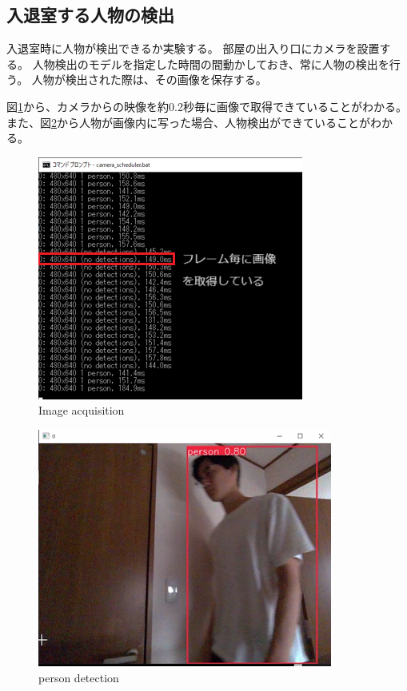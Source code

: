 \documentclass[10pt]{jarticle}
\begin{document}
    \subsection{入退室する人物の検出}
    \label{experiment1}

入退室時に人物が検出できるか実験する。
部屋の出入り口にカメラを設置する。
人物検出のモデルを指定した時間の間動かしておき、常に人物の検出を行う。
人物が検出された際は、その画像を保存する。

図\ref{Image acquisition}から、カメラからの映像を約0.2秒毎に画像で取得できていることがわかる。
また、図\ref{person detection}から人物が画像内に写った場合、人物検出ができていることがわかる。

\begin{figure}[!h]
    \centering
    \includegraphics[width=0.8\linewidth]{fig/frame3.png}
    \caption{Image acquisition}
    \label{Image acquisition}
    \end{figure}

\begin{figure}[!h]
    \centering
    \includegraphics[width=0.8\linewidth]{fig/boundingbox.png}
    \caption{person detection}
    \label{person detection}
    \end{figure}
\end{document}
